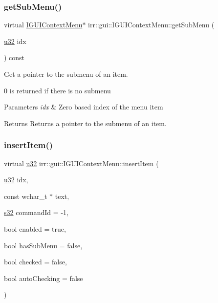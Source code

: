 \subsubsection{\texorpdfstring{get\+Sub\+Menu()}{getSubMenu()}\hspace{0.1cm}{\footnotesize\ttfamily [2/2]}}
{\footnotesize\ttfamily virtual \hyperlink{classirr_1_1gui_1_1IGUIContextMenu}{I\+G\+U\+I\+Context\+Menu}$\ast$ irr\+::gui\+::\+I\+G\+U\+I\+Context\+Menu\+::get\+Sub\+Menu (\begin{DoxyParamCaption}\item[{\hyperlink{namespaceirr_a0416a53257075833e7002efd0a18e804}{u32}}]{idx }\end{DoxyParamCaption}) const\hspace{0.3cm}{\ttfamily [pure virtual]}}



Get a pointer to the submenu of an item. 

0 is returned if there is no submenu 
\begin{DoxyParams}{Parameters}
{\em idx} & Zero based index of the menu item \\
\hline
\end{DoxyParams}
\begin{DoxyReturn}{Returns}
Returns a pointer to the submenu of an item. 
\end{DoxyReturn}
\mbox{\label{classirr_1_1gui_1_1IGUIContextMenu_ad4695f88c63ffc09690c5ff682c3aabc}} 
\subsubsection{\texorpdfstring{insert\+Item()}{insertItem()}\hspace{0.1cm}{\footnotesize\ttfamily [1/2]}}
{\footnotesize\ttfamily virtual \hyperlink{namespaceirr_a0416a53257075833e7002efd0a18e804}{u32} irr\+::gui\+::\+I\+G\+U\+I\+Context\+Menu\+::insert\+Item (\begin{DoxyParamCaption}\item[{\hyperlink{namespaceirr_a0416a53257075833e7002efd0a18e804}{u32}}]{idx,  }\item[{const wchar\+\_\+t $\ast$}]{text,  }\item[{\hyperlink{namespaceirr_ac66849b7a6ed16e30ebede579f9b47c6}{s32}}]{command\+Id = {\ttfamily -\/1},  }\item[{bool}]{enabled = {\ttfamily true},  }\item[{bool}]{has\+Sub\+Menu = {\ttfamily false},  }\item[{bool}]{checked = {\ttfamily false},  }\item[{bool}]{auto\+Checking = {\ttfamily false} }\end{DoxyParamCaption})\hspace{0.3cm}{\ttfamily [pure virtual]}}



